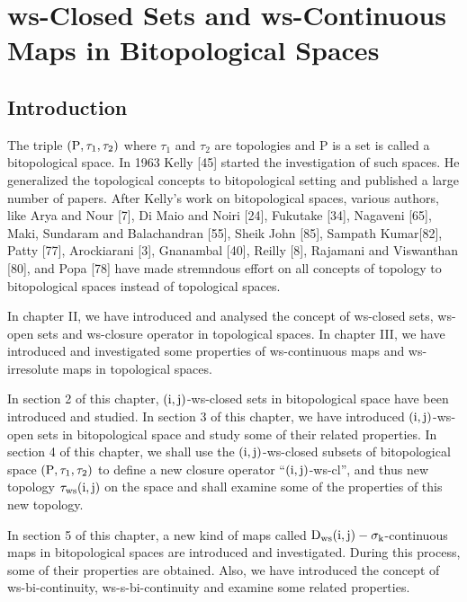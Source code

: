 \chapter{ws-Closed Sets and ws-Continuous Maps in Bitopological Spaces}
\graphicspath{{Chapter7/Chapter7Figs/EPS/}{Chapter7/Chapter7Figs/}}

\section{Introduction}\label{sec7.1}

The triple $(\mathrm{P}, \tau_1, \tau_2)$ where $\tau_1$ and $\tau_2$ are topologies and P is a set is called a bitopological space. In 1963 Kelly [45] started the investigation of such spaces. He generalized the topological concepts to bitopological setting and published a large number of papers. After Kelly’s work on bitopological spaces, various authors, like Arya and Nour [7], Di Maio and Noiri [24], Fukutake [34], Nagaveni [65], Maki, Sundaram and Balachandran [55], Sheik John [85], Sampath Kumar[82], Patty [77], Arockiarani [3], Gnanambal [40], Reilly [8], Rajamani and Viswanthan [80], and Popa [78] have made stremndous effort on all concepts of topology to bitopological spaces instead of topological spaces.

In chapter II, we have introduced and analysed the concept of ws-closed sets, ws-open sets and ws-closure operator in topological spaces. In chapter III, we have introduced and investigated some properties of ws-continuous maps and ws-irresolute maps in topological spaces.

In section 2 of this chapter, $(\mathrm{i},\mathrm{j})$-ws-closed sets in bitopological space have been introduced and studied. In section 3 of this chapter, we have introduced $(\mathrm{i}, \mathrm{j})$-ws-open sets in bitopological space and study some of their related properties. In section 4 of this chapter, we shall use the $(\mathrm{i}, \mathrm{j})$-ws-closed subsets of bitopological space $(\mathrm{P}, \tau_1, \tau_2)$ to define a new closure operator ``$(\mathrm{i}, \mathrm{j})$-ws-cl'', and thus new topology $\tau_{\mathrm{ws}}(\mathrm{i}, \mathrm{j})$ on the space and shall examine some of the properties of this new topology.

In section 5 of this chapter, a new kind of maps called $\mathrm{D}_{\mathrm{ws}} (\mathrm{i}, \mathrm{j})-\sigma_{\mathrm{k}}$-continuous maps in bitopological spaces are introduced and investigated. During this process, some of their properties are obtained. Also, we have introduced the concept of ws-bi-continuity, ws-s-bi-continuity and examine some related properties.


